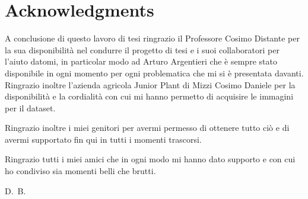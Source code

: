 

\cleardoublepage
{}
{}
\thispagestyle{plain}

\bigskip

\begingroup
\let\clearpage\relax
\let\cleardoublepage\relax
\let\cleardoublepage\relax

\chapter*{Acknowledgments}

A conclusione di questo lavoro di tesi ringrazio il Professore Cosimo Distante per la sua disponibilità nel condurre il progetto di tesi e i suoi collaboratori per
l'aiuto datomi, in particolar modo ad Arturo Argentieri che è sempre stato disponibile in ogni momento per ogni problematica che mi si è presentata davanti.
Ringrazio inoltre l'azienda agricola Junior Plant di Mizzi Cosimo Daniele per la disponibilità e la cordialità con cui mi hanno permetto di acquisire le immagini per il
dataset.

Ringrazio inoltre i miei genitori per avermi permesso di ottenere tutto ciò e di avermi supportato fin qui in tutti i momenti trascorsi.

Ringrazio tutti i miei amici che in ogni modo mi hanno dato supporto e con cui ho condiviso sia momenti belli che brutti.


\bigskip

\hfill D.~B.

\endgroup
